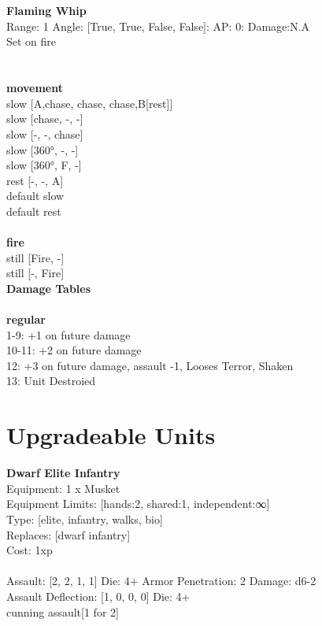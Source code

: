 \ \\

\ \\
{\bf Flaming Whip } \\



Range: 1  Angle: [True, True, False, False]: AP: 0: Damage:N.A \\
Set on fire\\ 




 
\ \\



\ \\ {\bf movement } \\
slow [A,chase, chase, chase,B[rest]] \\
slow [chase, -, -] \\
slow [-, -, chase] \\
slow [360°, -, -] \\
slow [360°, F, -] \\
rest [-, -, A] \\
default slow \\
default rest \\
\ \\ {\bf fire } \\
still [Fire, -] \\
still [-, Fire] \\


{\bf Damage Tables} \\
\ \\ {\bf regular } \\
1-9: +1 on future damage \\
10-11: +2 on future damage \\
12: +3 on future damage, assault -1, Looses Terror, Shaken \\
13: Unit Destroied \\










\pagebreak\section{Upgradeable Units}{\bf Dwarf Elite Infantry } \\
Equipment: 1 x Musket \\
Equipment Limits: [hands:2, shared:1, independent:∞] \\
Type: [elite, infantry, walks, bio] \\
Replaces: [dwarf infantry] \\
Cost: 1xp\\
\ \\
Assault: [2, 2, 1, 1] Die: 4+ Armor Penetration: 2 Damage: d6-2 \\
Assault Deflection: [1, 0, 0, 0] Die: 4+\\
\indent cunning assault[1 for 2]\\ 
 
